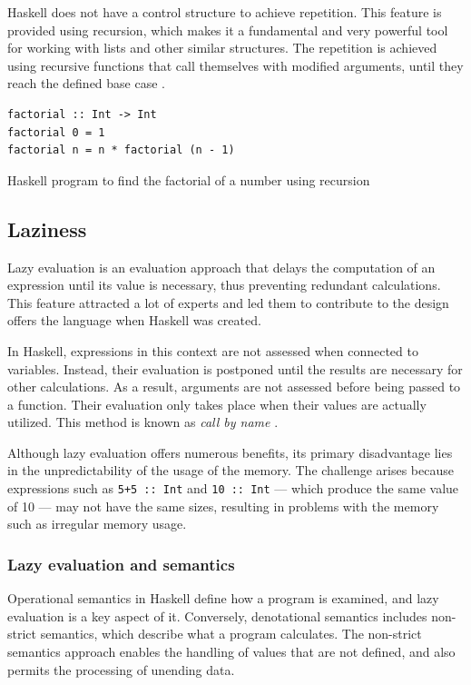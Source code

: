 \documentclass[a4paper, titlepage, twoside]{article}
\begin{document}
Haskell does not have a control structure to achieve repetition. This feature is provided using recursion, which makes it a fundamental and very powerful tool for working with lists and other similar structures. The repetition is achieved using recursive functions that call themselves with modified arguments, until they reach the defined base case \autocite{kremerCPSC449Programming2015}.

\begin{listing}[htbp]
\begin{verbatim}
factorial :: Int -> Int
factorial 0 = 1
factorial n = n * factorial (n - 1)
\end{verbatim}
\caption{Haskell program to find the factorial of a number using recursion}
\end{listing}

\subsection{Laziness}
\label{sec:orgfb0080e}

Lazy evaluation is an evaluation approach that delays the computation of an expression until its value is necessary, thus preventing redundant calculations. This feature attracted a lot of experts and led them to contribute to the design offers the language when Haskell was created.

In Haskell, expressions in this context are not assessed when connected to variables. Instead, their evaluation is postponed until the results are necessary for other calculations. As a result, arguments are not assessed before being passed to a function. Their evaluation only takes place when their values are actually utilized. This method is known as \emph{call by name} \autocite{haskellwikiHaskellHaskellWiki2023}.

Although lazy evaluation offers numerous benefits, its primary disadvantage lies in the unpredictability of the usage of the memory. The challenge arises because expressions such as \texttt{5+5 :: Int} and \texttt{10 :: Int} --- which produce the same value of 10 --- may not have the same sizes, resulting in problems with the memory such as irregular memory usage.

\subsubsection{Lazy evaluation and semantics}
\label{sec:org7c6a552}

Operational semantics in Haskell define how a program is examined, and lazy evaluation is a key aspect of it. Conversely, denotational semantics includes non-strict semantics, which describe what a program calculates. The non-strict semantics approach enables the handling of values that are not defined, and also permits the processing of unending data.
\end{document}
